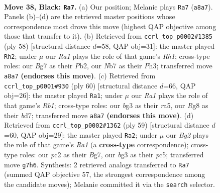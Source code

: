 \documentclass[11pt]{article}
\begin{document}
\clearpage

\begin{figure}[p]\centering
\begin{subfigure}{0.46\textwidth}\centering
\resizebox{\linewidth}{!}{%
\newchessgame
\chessboard[
  setfen={r5r1/1n3kbp/p2p2p1/4p1P1/Pp2P2P/1P3PBR/2PK2B1/R7 b - a3 0 38},
  showmover=false,
  pgfstyle=straightmove, color=movearrow, markmove={a8-a7}
]}
\caption{}
\end{subfigure}\hfill
\begin{subfigure}{0.46\textwidth}\centering
\resizebox{\linewidth}{!}{%
\newchessgame
\chessboard[
  setfen={7r/2rbkp2/4p1p1/pp1pP2p/5P2/P1PBK1PP/1P6/R6R w - - 3 30},
  showmover=false,
  pgfstyle=straightmove, color=movearrow, markmove={h1-h2}
]}
\caption{}
\end{subfigure}
\\[4pt]
\begin{subfigure}{0.46\textwidth}\centering
\resizebox{\linewidth}{!}{%
\newchessgame
\chessboard[
  setfen={2r5/1p1b1pkp/1p2p3/r2pPpP1/7P/P2P2K1/1P2P1B1/1R3R2 w - - 2 31},
  showmover=false,
  pgfstyle=straightmove, color=movearrow, markmove={b1-a1}
]}
\caption{}
\end{subfigure}\hfill
\begin{subfigure}{0.46\textwidth}\centering
\resizebox{\linewidth}{!}{%
\newchessgame
\chessboard[
  setfen={r3r3/1p2p1bk/3p2pp/2PP1p2/1P3B1P/1R4P1/3NbP2/2R3K1 b - - 0 30},
  showmover=false,
  pgfstyle=straightmove, color=movearrow, markmove={a8-a2}
]}
\caption{}
\end{subfigure}
\caption{\textbf{Move 38, Black: \texttt{Ra7}.} (a) Our position; Melanie plays \texttt{Ra7} (\texttt{a8a7}). Panels (b)--(d) are the retrieved master positions whose correspondence most drove this move (highest QAP objective among those that transfer to it). (b) Retrieved from \texttt{ccrl\_top\_p0002\#1385} (ply 58) [structural distance $d$=58, QAP obj=31]: the master played \texttt{Rh2}; under $\mu$ our \emph{Ra1} plays the role of that game's \emph{Rh1}; cross-type roles: our \emph{B}g7 as their \emph{P}b2, our \emph{N}b7 as their \emph{P}h3; transferred move \texttt{a8a7} \textbf{(endorses this move)}. (c) Retrieved from \texttt{ccrl\_top\_p0001\#930} (ply 60) [structural distance $d$=66, QAP obj=26]: the master played \texttt{Ra1}; under $\mu$ our \emph{Ra1} plays the role of that game's \emph{Rb1}; cross-type roles: our \emph{b}g3 as their \emph{r}a5, our \emph{R}g8 as their \emph{b}d7; transferred move \texttt{a8a7} \textbf{(endorses this move)}. (d) Retrieved from \texttt{ccrl\_top\_p0002\#1362} (ply 59) [structural distance $d$=60, QAP obj=29]: the master played \texttt{Ra2}; under $\mu$ our \emph{Bg2} plays the role of that game's \emph{Ra1} (a \textbf{cross-type} correspondence); cross-type roles: our \emph{p}c2 as their \emph{B}g7, our \emph{b}g3 as their \emph{p}c5; transferred move \texttt{g7h6}. Synthesis: 2 retrieved analogs transferred to \texttt{Ra7} (summed QAP objective 57, the strongest correspondence among the candidate moves); Melanie committed it via the \texttt{search} selector.}
\label{fig:thought-m75}
\end{figure}
\end{document}
